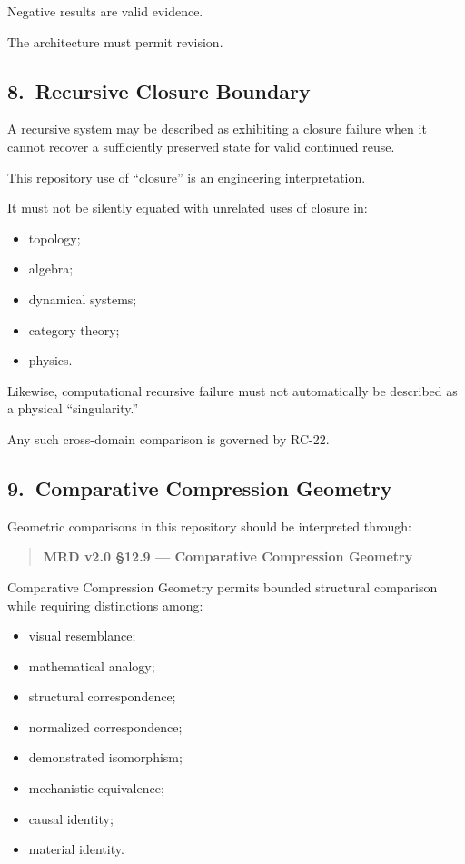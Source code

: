 Negative results are valid evidence.

The architecture must permit revision.

\subsection*{8.\ Recursive Closure Boundary}

A recursive system may be described as exhibiting a closure failure when it
cannot recover a sufficiently preserved state for valid continued reuse.

This repository use of ``closure'' is an engineering interpretation.

It must not be silently equated with unrelated uses of closure in:

\begin{itemize}
    \item topology;
    \item algebra;
    \item dynamical systems;
    \item category theory;
    \item physics.
\end{itemize}

Likewise, computational recursive failure must not automatically be described
as a physical ``singularity.''

Any such cross-domain comparison is governed by RC-22.

\subsection*{9.\ Comparative Compression Geometry}

Geometric comparisons in this repository should be interpreted through:

\begin{quote}
\textbf{MRD v2.0 \S 12.9 --- Comparative Compression Geometry\texttrademark}
\end{quote}

Comparative Compression Geometry permits bounded structural comparison while
requiring distinctions among:

\begin{itemize}
    \item visual resemblance;
    \item mathematical analogy;
    \item structural correspondence;
    \item normalized correspondence;
    \item demonstrated isomorphism;
    \item mechanistic equivalence;
    \item causal identity;
    \item material identity.
\end{itemize}

